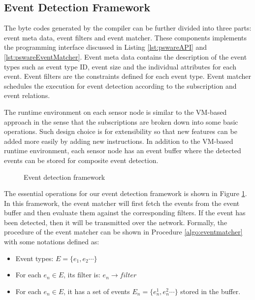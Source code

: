 \subsection{Event Detection Framework}
The byte codes generated by the compiler can be further divided into three parts: event meta data, event filters and event matcher. These components implements the programming interface discussed in Listing \ref{lst:pswareAPI} and \ref{lst:pswareEventMatcher}. Event meta data contains the description of the event types such as event type ID, event size and the individual attributes for each event. Event filters are the constraints defined for each event type. Event matcher schedules the execution for event detection according to the subscription and event relations.

The runtime environment on each sensor node is similar to the VM-based approach \cite{mate} in the sense that the subscriptions are broken down into some basic operations. Such design choice is for extensibility so that new features can be added more easily by adding new instructions. In addition to the VM-based runtime environment, each sensor node has an event buffer where the detected events can be stored for composite event detection.

\begin{figure}
\centering
{}
\caption{Event detection framework}
\label{fig:eventdetectionframework2}
\end{figure}

The essential operations for our event detection framework is shown in Figure \ref{fig:eventdetectionframework2}. In this framework, the event matcher will first fetch the events from the event buffer and then evaluate them against the corresponding filters. If the event has been detected, then it will be transmitted over the network. Formally, the procedure of the event matcher can be shown in Procedure \ref{algo:eventmatcher} with some notations defined as:
\begin{itemize}
\item Event types: \(E=\{e_1, e_2 \cdots \}\)
\item For each \(e_n\in E\), its filter is: \(e_n\rightarrow filter\)
\item For each \(e_n\in E\), it has a set of events \(E_n=\{e_n^1, e_n^2 \cdots \}\) stored in the buffer.
\end{itemize}

